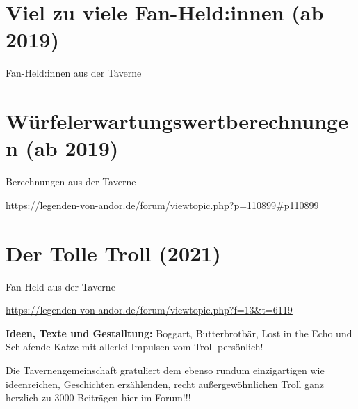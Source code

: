 {\parindent0pt




\section{Viel zu viele Fan-Held:innen (ab 2019)}

\begin{center}
    Fan-Held:innen aus der Taverne
\end{center}






\newpage


\section{Würfelerwartungswertberechnungen (ab 2019)}


\begin{center}
    Berechnungen aus der Taverne

    \url{https://legenden-von-andor.de/forum/viewtopic.php?p=110899#p110899}
\end{center}










\newpage
\section{Der Tolle Troll (2021)}

\begin{center}
    Fan-Held aus der Taverne

    \url{https://legenden-von-andor.de/forum/viewtopic.php?f=13&t=6119}
\end{center}




\textbf{Ideen, Texte und Gestalltung:} Boggart, Butterbrotbär, Lost in the Echo und Schlafende Katze mit allerlei Impulsen vom Troll persönlich!\bigskip

Die Tavernengemeinschaft gratuliert dem ebenso rundum einzigartigen wie ideenreichen, Geschichten erzählenden, recht außergewöhnlichen Troll ganz herzlich zu 3000 Beiträgen hier im Forum!!!

}
